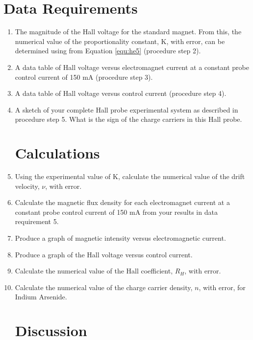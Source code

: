 \section{{\bf Data Requirements}}
\begin{enumerate}[resume]

\item The magnitude of the Hall voltage for the standard magnet.  From this, the numerical value of the proportionality constant, K, with error, can be determined using from Equation \ref{equ:he5} (procedure step 2).

\item A data table of Hall voltage versus electromagnet current at a constant probe control current of 150 mA (procedure step 3).

\item A data table of Hall voltage versus control current (procedure step 4). 

\item A sketch of your complete Hall probe experimental system as described in procedure step 5.  What is the sign of the charge carriers in this Hall probe.

\section{Calculations}
\item Using the experimental value of K, calculate the numerical value of the drift velocity, $\nu$, with error.

\item Calculate the magnetic flux density for each electromagnet current at a constant probe control current of 150 mA from your results in data requirement 5.
 
\item Produce a graph of magnetic intensity versus electromagnetic current.

\item Produce a graph of the Hall voltage versus control current.

\item Calculate the numerical value of the Hall coefficient, $R_H$, with error. 

\item Calculate the numerical value of the charge carrier density, $n$, with error, for Indium Arsenide.

\section{Discussion}


\end{enumerate}
